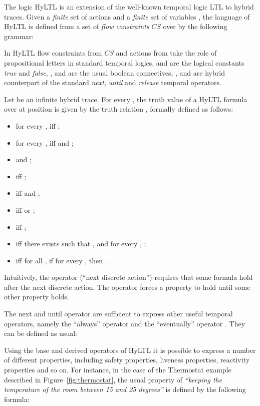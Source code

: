 \documentclass[submission,copyright,creativecommons]{eptcs}
\newcommand{\hyltl}{\textsf{HyLTL}\xspace}
\newcommand{\ltl}{\textsf{LTL}\xspace}
\newcommand{\fcs}{\ensuremath{CS}\xspace}
\renewcommand{\quote}[1]{\emph{``#1''}}
\begin{document}
The logic \hyltl is an extension of the well-known temporal logic \ltl to hybrid traces. Given a \emph{finite} set of actions  and a \emph{finite} set of variables , the language of \hyltl is defined from a set of \emph{flow constraints} \fcs over  by the following grammar:
 

\noindent In \hyltl flow constraints from \fcs and actions from  take the role of propositional letters in standard temporal logics,  and  are the logical constants \emph{true} and \emph{false}, ,  and  are the usual boolean connectives, ,  and  are hybrid counterpart of the standard \emph{next}, \emph{until} and \emph{release} temporal operators. 

\medskip

Let  be an infinite hybrid trace. For every , the truth value of a \hyltl formula  over  at position  is given by the truth relation , formally defined as follows:

\begin{itemize}
	\item for every ,  iff ;
	\item for every ,  iff  and ;
	\item  and ;
	\item  iff ;
	\item  iff  and ;
	\item  iff  or ;
	\item  iff ;
	\item  iff there exists  such that , and for every , ;	
	\item  iff for all , if for every ,  then .
\end{itemize}

\noindent Intuitively, the operator  (``next discrete action'') requires that some formula hold after the next discrete action. The operator  forces a property to hold until some other property holds.

The next and until operator are sufficient to express other useful temporal operators, namely the ``always'' operator  and the ``eventually'' operator . They can be defined as usual:



\noindent Using the base and derived operators of \hyltl it is possible to express a number of different properties, including safety properties, liveness properties, reactivity properties and so on. For instance, in the case of the Thermostat example described in Figure~\ref{fig:thermostat}, the usual property of \quote{keeping the temperature of the room between 15 and 25 degrees} is defined by the following formula:
\end{document}
